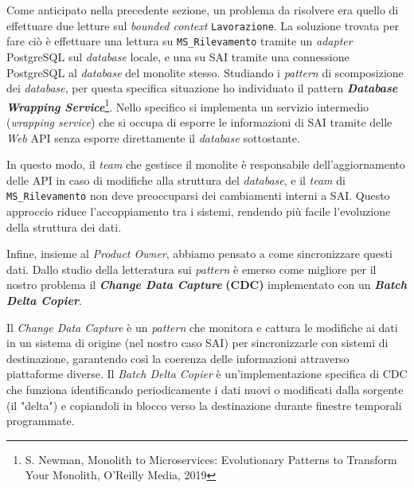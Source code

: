         \vspace{0.2 em}
        \noindent Come anticipato nella precedente sezione, un problema da risolvere era quello di effettuare due letture sul \textit{bounded context} \texttt{Lavorazione}. La soluzione trovata per fare ciò è effettuare una lettura su \texttt{MS\_Rilevamento} tramite un \textit{adapter} PostgreSQL sul \textit{database} locale, e una su SAI tramite una connessione PostgreSQL al \textit{database} del monolite stesso. Studiando i \textit{pattern} di scomposizione dei \textit{database}, per questa specifica situazione ho individuato il pattern \textbf{\textit{Database Wrapping Service}}\footnote{S. Newman, Monolith to Microservices: Evolutionary Patterns to Transform Your Monolith, O'Reilly Media, 2019}. Nello specifico si implementa un servizio intermedio (\textit{wrapping service}) che si occupa di esporre le informazioni di SAI tramite delle \textit{Web} API senza esporre direttamente il \textit{database} sottostante. 

        \vspace{0.2 em}
        \noindent In questo modo, il \textit{team} che gestisce il monolite è responsabile dell’aggiornamento delle API in caso di modifiche alla struttura del \textit{database}, e il \textit{team} di \texttt{MS\_Rilevamento} non deve preoccuparsi dei cambiamenti interni a SAI. Questo approccio riduce l'accoppiamento tra i sistemi, rendendo più facile l'evoluzione della struttura dei dati.

        \vspace{0.2 em}
        \noindent Infine, insieme al \textit{Product Owner}, abbiamo pensato a come sincronizzare questi dati. Dallo studio della letteratura sui \textit{pattern} è emerso come migliore per il nostro problema il \textit{\textbf{Change Data Capture}} \textbf{(CDC)} implementato con un \textbf{\textit{Batch Delta Copier}}. 
        
        
        \vspace{0.2 em} 
        \noindent Il \textit{Change Data Capture} è un \textit{pattern} che monitora e cattura le modifiche ai dati in un sistema di origine (nel nostro caso SAI) per sincronizzarle con sistemi di destinazione, garantendo così la coerenza delle informazioni attraverso piattaforme diverse. Il \textit{Batch Delta Copier} è un'implementazione specifica di CDC che funziona identificando periodicamente i dati nuovi o modificati dalla sorgente (il "delta") e copiandoli in blocco verso la destinazione durante finestre temporali programmate.


